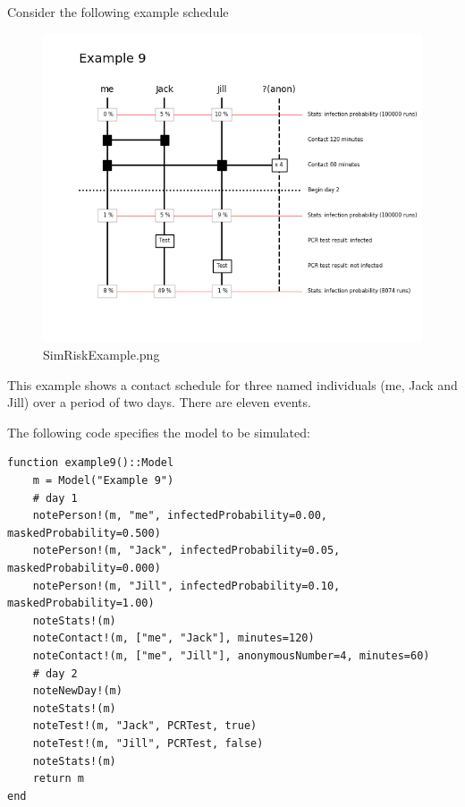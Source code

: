 \documentclass[11pt]{article}
\begin{document}
Consider the following example schedule

    \begin{figure}
\centering
\includegraphics{SimRiskExample.png}
\caption{SimRiskExample.png}
\end{figure}

    This example shows a contact schedule for three named individuals (me,
Jack and Jill) over a period of two days. There are eleven events.

The following code specifies the model to be simulated:

\begin{verbatim}
function example9()::Model
    m = Model("Example 9")
    # day 1
    notePerson!(m, "me", infectedProbability=0.00, maskedProbability=0.500)
    notePerson!(m, "Jack", infectedProbability=0.05, maskedProbability=0.000)
    notePerson!(m, "Jill", infectedProbability=0.10, maskedProbability=1.00)
    noteStats!(m)
    noteContact!(m, ["me", "Jack"], minutes=120)
    noteContact!(m, ["me", "Jill"], anonymousNumber=4, minutes=60)
    # day 2
    noteNewDay!(m)
    noteStats!(m)
    noteTest!(m, "Jack", PCRTest, true)
    noteTest!(m, "Jill", PCRTest, false)
    noteStats!(m)
    return m
end    
\end{verbatim}
\end{document}
